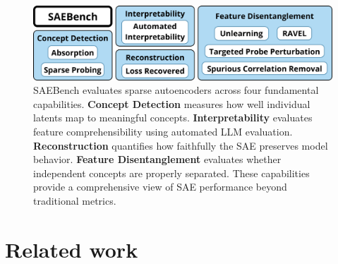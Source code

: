 \documentclass{article}
\theoremstyle{plain}
\theoremstyle{definition}
\theoremstyle{remark}
\begin{document}


\begin{figure}
    \centering
    \includegraphics[width=0.85\linewidth]{images/saebench_horizontal.png}
    \caption{
    SAEBench evaluates sparse autoencoders across four fundamental capabilities. \textbf{Concept Detection} measures how well individual latents map to meaningful concepts. \textbf{Interpretability} evaluates feature comprehensibility using automated LLM evaluation. \textbf{Reconstruction} quantifies how faithfully the SAE preserves model behavior. \textbf{Feature Disentanglement} evaluates whether independent concepts are properly separated. These capabilities provide a comprehensive view of SAE performance beyond traditional metrics.
}

    \label{fig:figure_1}
\end{figure}

\section{Related work}
\end{document}
